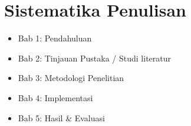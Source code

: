 \section{Sistematika Penulisan}
\label{sec:sistematikaPenulisan}

\begin{itemize}
	\item Bab 1: Pendahuluan
	\item Bab 2: Tinjauan Pustaka / Studi literatur
	\item Bab 3: Metodologi Penelitian
	\item Bab 4: Implementasi
	\item Bab 5: Hasil & Evaluasi
\end{itemize}

